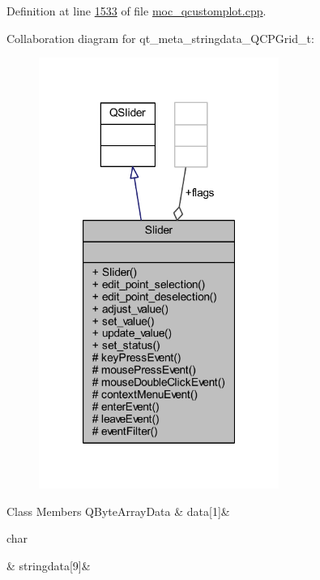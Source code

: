 Definition at line \hyperlink{a00067_source_l01533}{1533} of file \hyperlink{a00067_source}{moc\+\_\+qcustomplot.\+cpp}.



Collaboration diagram for qt\+\_\+meta\+\_\+stringdata\+\_\+\+Q\+C\+P\+Grid\+\_\+t\+:
\nopagebreak
\begin{figure}[H]
\begin{center}
\leavevmode
\includegraphics[width=222pt]{d5/d0f/a00308}
\end{center}
\end{figure}
\begin{DoxyFields}{Class Members}
\hypertarget{a00067_a7e6e5bd7ca3eb3f18073d11e635e5cb9}{Q\+Byte\+Array\+Data}\label{a00067_a7e6e5bd7ca3eb3f18073d11e635e5cb9}
&
data\mbox{[}1\mbox{]}&
\\
\hline

\hypertarget{a00067_a0bcd248c91a252f9ad93a353181ea07e}{char}\label{a00067_a0bcd248c91a252f9ad93a353181ea07e}
&
stringdata\mbox{[}9\mbox{]}&
\\
\hline

\end{DoxyFields}
\label{dd/df4/a00193}
\hypertarget{a00067_dd/df4/a00193}{}
